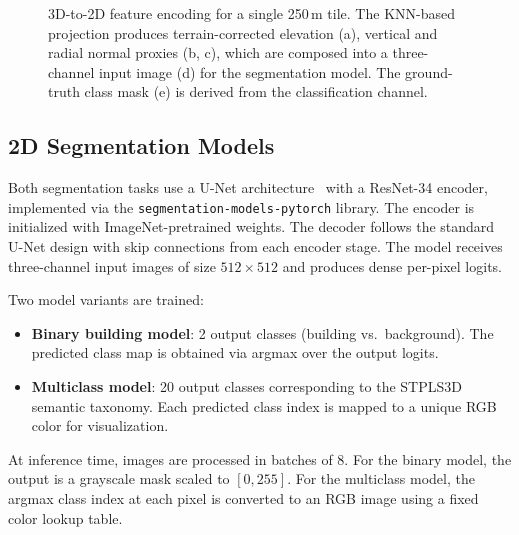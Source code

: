 \documentclass[11pt]{article}
\begin{document}
\begin{figure}[t]
    \centering
    \caption{3D-to-2D feature encoding for a single 250\,m tile. The KNN-based projection produces terrain-corrected elevation (a), vertical and radial normal proxies (b, c), which are composed into a three-channel input image (d) for the segmentation model. The ground-truth class mask (e) is derived from the classification channel.}
    \label{fig:features}
\end{figure}

\subsection{2D Segmentation Models}
\label{sec:method_segmentation}

Both segmentation tasks use a U-Net architecture~\cite{ronneberger2015unet} with a ResNet-34 encoder, implemented via the \texttt{segmentation-models-pytorch} library.
The encoder is initialized with ImageNet-pretrained weights.
The decoder follows the standard U-Net design with skip connections from each encoder stage.
The model receives three-channel input images of size $512 \times 512$ and produces dense per-pixel logits.

Two model variants are trained:
\begin{itemize}
    \item \textbf{Binary building model}: 2 output classes (building vs.\ background). The predicted class map is obtained via argmax over the output logits.
    \item \textbf{Multiclass model}: 20 output classes corresponding to the STPLS3D semantic taxonomy. Each predicted class index is mapped to a unique RGB color for visualization.
\end{itemize}

At inference time, images are processed in batches of 8.
For the binary model, the output is a grayscale mask scaled to $[0, 255]$.
For the multiclass model, the argmax class index at each pixel is converted to an RGB image using a fixed color lookup table.
\end{document}

